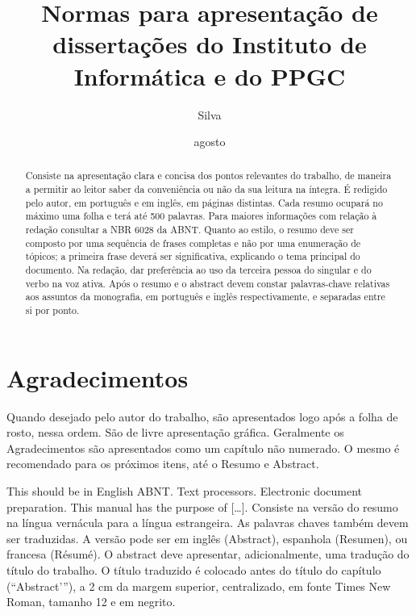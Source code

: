 \documentclass[ppgc,diss]{iiufrgs}
\title{
    Normas para apresentação de dissertações do Instituto de Informática e do
    PPGC
}
\author{Silva}{João da}
\date{agosto}{2014}
\begin{document}
\maketitle


\chapter*{Agradecimentos}
Quando desejado pelo autor do trabalho, são apresentados logo após a folha de
rosto, nessa ordem.
São de livre apresentação gráfica.
Geralmente os Agradecimentos são apresentados como um capítulo não numerado.
O mesmo é recomendado para os próximos itens, até o Resumo e Abstract.


\begin{abstract}
    Consiste na apresentação clara e concisa dos pontos relevantes do trabalho,
    de maneira a permitir ao leitor saber da conveniência ou não da sua leitura na íntegra.
    É redigido pelo autor, em português e em inglês, em páginas distintas.
    Cada resumo ocupará no máximo uma folha e terá até 500 palavras.
    Para maiores informações com relação à redação consultar a NBR 6028 da ABNT.
    Quanto ao estilo, o resumo deve ser composto por uma sequência de frases
    completas e não por uma enumeração de tópicos; a primeira frase deverá ser
    significativa, explicando o tema principal do documento.
    Na redação, dar preferência ao uso da terceira pessoa do singular e do verbo na voz ativa.
    Após o resumo e o abstract devem constar palavras-chave relativas aos assuntos
    da monografia, em português e inglês respectivamente, e separadas entre si por ponto.
\end{abstract}

\begin{englishabstract}
    {This should be in English}
    {ABNT. Text processors. Electronic document preparation.}
    This manual has the purpose of [\ldots].
    Consiste na versão do resumo na língua vernácula para a língua estrangeira.
    As palavras chaves também devem ser traduzidas.
    A versão pode ser em inglês (Abstract), espanhola (Resumen), ou francesa (Résumé).
    O abstract deve apresentar, adicionalmente, uma tradução do título do trabalho.
    O título traduzido é colocado antes do título do capítulo (“Abstract’”), a
    2 cm da margem superior, centralizado, em fonte Times New Roman, tamanho 12 e em negrito.
\end{englishabstract}
\end{document}
